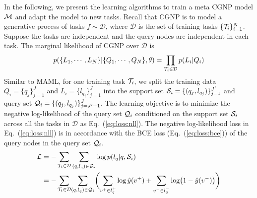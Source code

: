 In the following, we present the learning algorithms to train a meta CGNP model $\mathcal{M}$ and adapt the model to new tasks.
Recall that CGNP is to model a generative process of tasks $f \sim \mathcal{D}$, where $\mathcal{D}$ is the set of training tasks $\{ \mathcal{T}_i \}_{i = 1}^{N}$. Suppose the tasks are independent and the query nodes are independent in each task. The marginal likelihood of CGNP over $\mathcal{D}$ is 
\begin{align}
	p(\{L_1, \cdots, L_N\} | \{Q_1, \cdots, Q_N\}, \theta) = \prod_{\mathcal{T}_i \in \mathcal{D}} p(L_i | Q_i) 
\end{align}
Similar to MAML, for one training task $\mathcal{T}_i$, we split the training data $Q_i = \{ q_{j}\}_{j = 1}^{J}$ and $L_i = \{ l_{q_j} \}_{j = 1}^{J}$ into the support set $\mathcal{S}_i = \{ (q_{j}, l_{q_j})\}_{j = 1}^{J'}$ and query set $\mathcal{Q}_i = \{ (q_{j}, l_{q_j})\}_{j = J' + 1}^{J}$.
The learning objective is to minimize the negative log-likelihood of the query set $\mathcal{Q}_i$ conditioned on the support set $\mathcal{S}_i$ across all the tasks in $\mathcal{D}$ as Eq.~(\ref{eq:loss:nll}). 
The negative  log-likelihood loss in Eq.~(\ref{eq:loss:nll}) is in accordance with the BCE loss (Eq.~(\ref{eq:loss:bce})) of the query nodes in the query set $\mathcal{Q}_i$. 
\begin{align}
	\label{eq:loss:nll}
	\mathcal{L} &= -\sum_{\mathcal{T}_i \in \mathcal{D}} \sum _{(q, l_q) \in \mathcal{Q}_i} \log p(l_q | q, \mathcal{S}_i) \\
	\nonumber
	&= -\sum_{\mathcal{T}_i \in \mathcal{D}} \!\sum _{(q, l_q) \in \mathcal{Q}_i} \biggl (\sum_{v^{+} \in l_q^+} \log\hat{y}(v^+) +  \sum_{v^{-} \in l_q^-} \log (1-\hat{y}(v^-)) \biggr ) 
\end{align}



